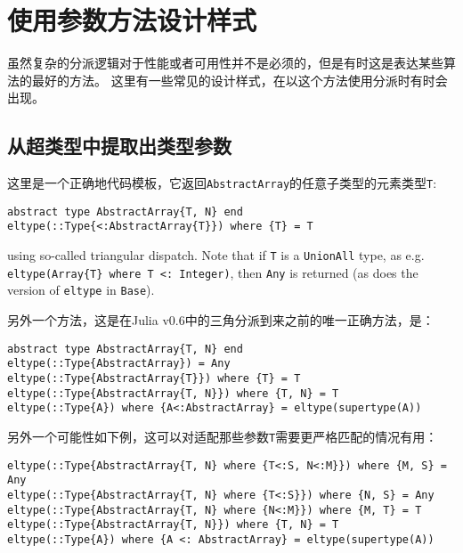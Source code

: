 \hypertarget{1696520674414442593}{}


\section{使用参数方法设计样式}



虽然复杂的分派逻辑对于性能或者可用性并不是必须的，但是有时这是表达某些算法的最好的方法。 这里有一些常见的设计样式，在以这个方法使用分派时有时会出现。



\hypertarget{13813570673284607064}{}


\subsection{从超类型中提取出类型参数}



这里是一个正确地代码模板，它返回\texttt{AbstractArray}的任意子类型的元素类型\texttt{T}:




\begin{verbatim}
abstract type AbstractArray{T, N} end
eltype(::Type{<:AbstractArray{T}}) where {T} = T
\end{verbatim}



using so-called triangular dispatch.  Note that if \texttt{T} is a \texttt{UnionAll} type, as e.g. \texttt{eltype(Array\{T\} where T <: Integer)}, then \texttt{Any} is returned (as does the version of \texttt{eltype} in \texttt{Base}).



另外一个方法，这是在Julia v0.6中的三角分派到来之前的唯一正确方法，是：




\begin{verbatim}
abstract type AbstractArray{T, N} end
eltype(::Type{AbstractArray}) = Any
eltype(::Type{AbstractArray{T}}) where {T} = T
eltype(::Type{AbstractArray{T, N}}) where {T, N} = T
eltype(::Type{A}) where {A<:AbstractArray} = eltype(supertype(A))
\end{verbatim}



另外一个可能性如下例，这可以对适配那些参数\texttt{T}需要更严格匹配的情况有用：




\begin{verbatim}
eltype(::Type{AbstractArray{T, N} where {T<:S, N<:M}}) where {M, S} = Any
eltype(::Type{AbstractArray{T, N} where {T<:S}}) where {N, S} = Any
eltype(::Type{AbstractArray{T, N} where {N<:M}}) where {M, T} = T
eltype(::Type{AbstractArray{T, N}}) where {T, N} = T
eltype(::Type{A}) where {A <: AbstractArray} = eltype(supertype(A))
\end{verbatim}



